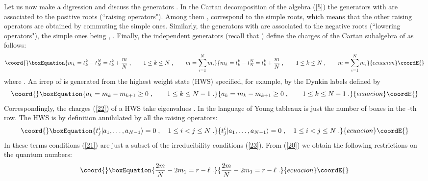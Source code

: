 \documentclass[a4paper,12pt]{article}
\begin{document}
Let us now make a digression and discuss the \coordHE{} 
generators \coordHE{}. In the Cartan decomposition of the 
\coordHE{} algebra (\ref{5}) the generators with \coordHE{} are associated to the positive roots (``raising 
operators"). Among them \coordHE{}, \coordHE{} correspond 
to the simple roots, which means that the other raising operators 
are obtained by commuting the simple ones. Similarly, the 
generators with \coordHE{} are associated to the 
negative roots (``lowering operators"), the simple ones being 
\coordHE{}, \coordHE{}. Finally, the \coordHE{} independent 
generators \coordHE{} (recall that \coordHE{}) define the 
\coordHE{} charges of the Cartan subalgebra of 
\coordHE{} as follows: 
\begin{equation}\coord{}\boxEquation{\label{22}
  m_k=t^k_k- t^N_N = t^k_k + {m\over N}\;, 
\qquad 1\leq k \leq N\;, \qquad m= \sum^{N}_{i=1}m_i 
}{m_k=t^k_k- t^N_N = t^k_k + {m\over N}\;, 
\qquad 1\leq k \leq N\;, \qquad m= \sum^{N}_{i=1}m_i 
}{ecuacion}\coordE{}\end{equation}
where \coordHE{}. An irrep of \coordHE{} is generated from 
the highest weight state (HWS) \coordHE{} 
specified, for example, by the Dynkin labels defined by 
\begin{equation}\coord{}\boxEquation{\label{24}
  a_k=m_k-m_{k+1}\geq 0\;, \qquad 1\leq k \leq N-1\;. 
}{a_k=m_k-m_{k+1}\geq 0\;, \qquad 1\leq k \leq N-1\;. 
}{ecuacion}\coordE{}\end{equation}
Correspondingly, the charges (\ref{22}) of a HWS take eigenvalues 
\coordHE{}. In the language 
of Young tableaux \coordHE{} is just the number of boxes in the \coordHE{}-th 
row. The HWS is by definition annihilated by all the raising 
operators: 
\begin{equation}\coord{}\boxEquation{\label{23}
  t^i_j|a_1,\ldots,a_{N-1}\rangle =0\;, \quad 1\leq i < j \leq N\;.
}{t^i_j|a_1,\ldots,a_{N-1}\rangle =0\;, \quad 1\leq i < j \leq N\;.
}{ecuacion}\coordE{}\end{equation}
In these terms conditions (\ref{21}) are just a subset of the 
irreducibility conditions (\ref{23}). From (\ref{20}) we obtain 
the following restrictions on the quantum numbers: 
\begin{equation}\coord{}\boxEquation{\label{25}
{2m\over N} - 2m_1 =r-\ell \;.
}{{2m\over N} - 2m_1 =r-\ell \;.
}{ecuacion}\coordE{}\end{equation}
 
\end{document}
